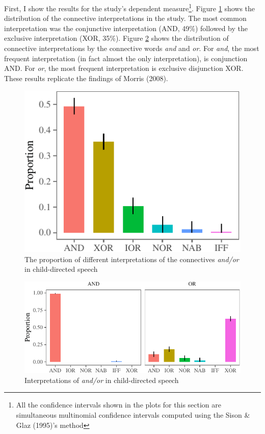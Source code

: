 \documentclass[oneside]{report}
\theoremstyle{definition}
\theoremstyle{definition}
\theoremstyle{definition}
\theoremstyle{remark}
\begin{document}
First, I show the results for the study's dependent measure\footnote{All
  the confidence intervals shown in the plots for this section are
  simultaneous multinomial confidence intervals computed using the Sison
  \& Glaz (1995)'s method}. Figure \ref{fig:interpretationPlot} shows
the distribution of the connective interpretations in the study. The
most common interpretation was the conjunctive interpretation (AND,
49\%) followed by the exclusive interpretation (XOR, 35\%). Figure
\ref{fig:connectivePlot} shows the distribution of connective
interpretations by the connective words \emph{and} and \emph{or}. For
\emph{and}, the most frequent interpretation (in fact almost the only
interpretation), is conjunction AND. For \emph{or}, the most frequent
interpretation is exclusive disjunction XOR. These results replicate the
findings of Morris (2008).
\begin{figure}[tb]

{\centering \includegraphics{figs/interpretationPlot-1} 

}

\caption{The proportion of different interpretations of the connectives \textit{and/or} in child-directed speech}\label{fig:interpretationPlot}
\end{figure}
\begin{figure}[tb]

{\centering \includegraphics{figs/connectivePlot-1} 

}

\caption{Interpretations of \textit{and/or} in child-directed speech}\label{fig:connectivePlot}
\end{figure}
\end{document}
